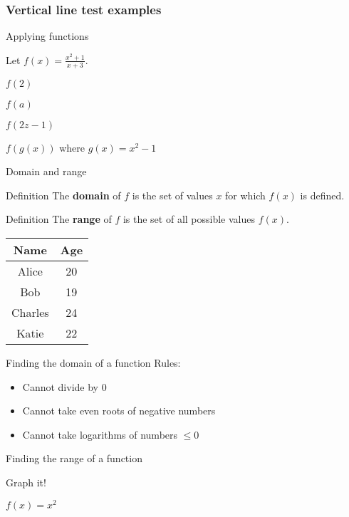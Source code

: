 \documentclass[t]{beamer}
\newenvironment{fpi}
  {\itemize[nolistsep,itemsep=\fill]}
  {\vfill\enditemize}
\begin{document}
\begin{frame}
\frametitle{Vertical line test examples}
\end{frame}

\begin{frame}{Applying functions}
\begin{fpi}
\item Let $\displaystyle f(x) = \frac{x^2 + 1}{x+3}$.
\item $f(2)$
\item $f(a)$
\item $f(2z -1)$
\item $f(g(x))$ where $g(x) = x^2 - 1$
\end{fpi}
\end{frame}

\begin{frame}{Domain and range}
\begin{block}{Definition}
The \textbf{domain} of $f$ is the set of values $x$ for which $f(x)$ is defined.
\end{block}
\begin{block}{Definition}
The \textbf{range} of $f$ is the set of all possible values $f(x)$.
\end{block}

\begin{table}
\begin{tabular}{c c}
Name & Age \\
\hline
Alice & 20 \\
Bob & 19 \\
Charles & 24 \\
Katie & 22 
\end{tabular}
\end{table}
\end{frame}

\begin{frame}{Finding the domain of a function}
Rules:
\begin{itemize}
\item Cannot divide by 0
\item Cannot take even roots of negative numbers  
\item Cannot take logarithms of numbers $\le 0$
\end{itemize}
\end{frame}

\begin{frame}{Finding the range of a function}
\begin{fpi}
\item Graph it!
\item $\displaystyle f(x) = x^2$
\end{fpi}
\end{frame}
\end{document}
